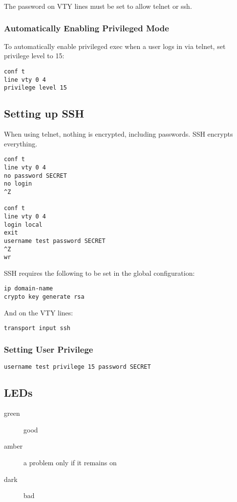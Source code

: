 The password on VTY lines must be set to allow telnet or ssh.

\subsubsection{Automatically Enabling Privileged Mode}

To automatically enable privileged exec when a user logs in via telnet, set
privilege level to 15:

\begin{verbatim}
conf t
line vty 0 4
privilege level 15
\end{verbatim}

\subsection{Setting up SSH}

When using telnet, nothing is encrypted, including passwords. SSH encrypts
everything.

\begin{verbatim}
conf t
line vty 0 4
no password SECRET
no login
^Z

conf t
line vty 0 4
login local
exit
username test password SECRET
^Z
wr
\end{verbatim}

SSH requires the following to be set in the global configuration:

\begin{verbatim}
ip domain-name
crypto key generate rsa
\end{verbatim}

And on the VTY lines:

\begin{verbatim}
transport input ssh
\end{verbatim}

\subsubsection{Setting User Privilege}

\begin{verbatim}
username test privilege 15 password SECRET
\end{verbatim}

\subsection{LEDs}

\begin{description}

\item[green]
good

\item[amber]
a problem only if it remains on

\item[dark]
bad

\end{description}


